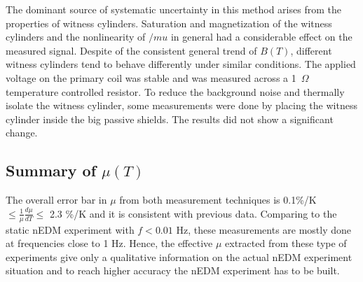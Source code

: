\documentclass[review]{elsarticle}
\begin{document}
The dominant source of systematic uncertainty in this method arises
from the properties of witness cylinders. Saturation and magnetization
of the witness cylinders and the nonlinearity of $/mu$ in general had
a considerable effect on the measured signal. Despite of the
consistent general trend of $B(T)$, different witness cylinders tend
to behave differently under similar conditions. The applied voltage on
the primary coil was stable and was measured across a 1~$\Omega$
temperature controlled resistor. To reduce the background noise and
thermally isolate the witness cylinder, some measurements were done by
placing the witness cylinder inside the big passive shields. The
results did not show a significant change.


\subsection{Summary of $\mu(T)$}
The overall error bar in $\mu$ from both measurement techniques is 0.1\%/K $\leq \frac{1}{\mu}\frac{d\mu}{dT} \leq$ 2.3 \%/K and it is consistent with previous data.
Comparing to the static nEDM experiment with $f < 0.01$ Hz, these measurements are mostly done at frequencies close to 1 Hz. Hence, the effective $\mu$ extracted from these type of experiments give
only a qualitative information on the actual nEDM experiment situation and to reach higher accuracy the nEDM experiment has to be built. 
\end{document}
